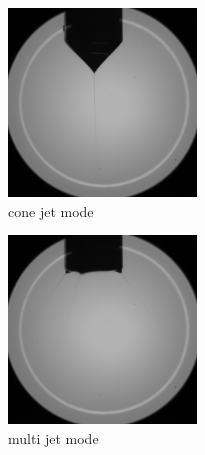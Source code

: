 \begin{multicols}{2}

    \begin{figure}[H]
        \center
        \includegraphics[width=5cm]{images/images_folder_3/conejetexample.png}
        \caption{cone jet mode}
    \end{figure}
    
    \begin{figure}[H]
        \center
        \includegraphics[width=5cm]{images/images_folder_3/multijetexample.png}
        \caption{multi jet mode}
    \end{figure}

    
\end{multicols}
